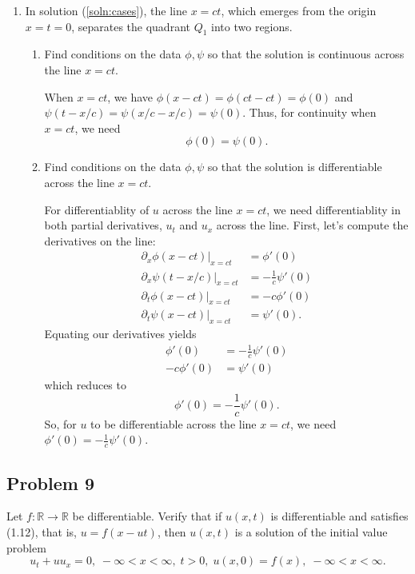 \documentclass[a4paper,12pt]{article}
\newcommand{\reals}{\mathbb{R}}
\begin{document}
\begin{enumerate}[label = \textbf{(\alph*)}]
        \item In solution (\ref{soln:cases}), the line $ x = ct $, which emerges from the origin $ x = t = 0 $, separates the quadrant $ Q_1 $ into two regions.
        \begin{enumerate}[label = \textbf{(\roman*)}]
            \item Find conditions on the data $ \phi, \psi $ so that the solution is continuous across the line $ x = ct $.
            
            When $ x = ct $, we have $ \phi(x - ct) = \phi(ct - ct) = \phi(0) $ and $ \psi(t - x/c) = \psi(x/c - x/c) = \psi(0)$. Thus, for continuity when $ x = ct $, we need
            \[
                \phi(0) = \psi(0).
            \]
            
            \item Find conditions on the data $ \phi, \psi $ so that the solution is differentiable across the line $ x = ct $.
            
            For differentiablity of $ u $ across the line $ x = ct $, we need differentiablity in both partial derivatives, $ u_t $ and $ u_x $ across the line. First, let's compute the derivatives on the line:
            \begin{align*}
                \left.\partial_x \phi(x - ct)\right\lvert_{x = ct}  &= \phi'(0) \\
                \left.\partial_x \psi(t - x/c)\right\lvert_{x = ct} &= -\frac{1}{c}\psi'(0) \\
                \left.\partial_t  \phi(x - ct)\right\lvert_{x = ct}  &= -c\phi'(0) \\
                \left.\partial_t  \psi(x - ct)\right\lvert_{x = ct}  &= \psi'(0).
            \end{align*}
            Equating our derivatives yields
            \begin{align*}
                \phi'(0) &= -\frac{1}{c}\psi'(0) \\
                -c\phi'(0) &= \psi'(0)
            \end{align*}
            which reduces to
            \[
                \phi'(0) = -\frac{1}{c}\psi'(0).
            \]
            So, for $ u $ to be differentiable across the line $ x = ct $, we need $ \phi'(0) = -\frac{1}{c}\psi'(0) $.
        \end{enumerate}
    \end{enumerate}

\subsection*{Problem 9}
    Let $ f : \reals \to \reals $ be differentiable. Verify that if $ u(x, t) $ is differentiable and satisfies (1.12), that is, $ u = f(x - ut) $, then $ u(x, t) $ is a solution of the initial value problem
    \[
    	u_t + u u_x = 0, \; -\infty < x < \infty, \; t > 0, \;u(x, 0) = f(x), \; -\infty < x < \infty.
    \]
    
\end{document}
